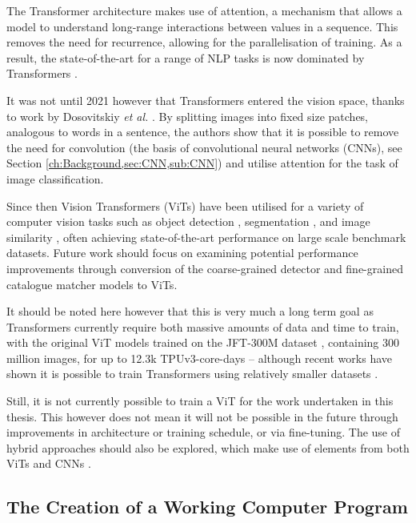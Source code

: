 The Transformer architecture makes use of attention, a mechanism that allows a model to understand long-range interactions between values in a sequence. This removes the need for recurrence, allowing for the parallelisation of training. As a result, the state-of-the-art for a range of NLP tasks is now dominated by Transformers \cite{brown_language_2020, devlin_bert_2019, ng_facebook_2019, wolf_transformers_2020}. 

It was not until 2021 however that Transformers entered the vision space, thanks to work by Dosovitskiy \textit{et al.} \cite{dosovitskiy_image_2021}. By splitting images into fixed size patches, analogous to words in a sentence, the authors show that it is possible to remove the need for convolution (the basis of convolutional neural networks (CNNs), see Section \ref{ch:Background,sec:CNN,sub:CNN}) and utilise attention for the task of image classification. 

Since then Vision Transformers (ViTs) have been utilised for a variety of computer vision tasks such as object detection \cite{fang_you_2021, li_exploring_2022}, segmentation \cite{hu_istr_2021, prangemeier_attention-based_2020, wang_end--end_2021, kirillov_segment_2023}, and image similarity \cite{el-nouby_training_2021}, often achieving state-of-the-art performance on large scale benchmark datasets. Future work should focus on examining potential performance improvements through conversion of the coarse-grained detector and fine-grained catalogue matcher models to ViTs. 

It should be noted here however that this is very much a long term goal as Transformers currently require both massive amounts of data and time to train, with the original ViT models trained on the JFT-300M dataset \cite{sun_revisiting_2017}, containing 300 million images, for up to 12.3k TPUv3-core-days -- although recent works have shown it is possible to train Transformers using relatively smaller datasets \cite{bennour_bat_2022}. 

Still, it is not currently possible to train a ViT for the work undertaken in this thesis. This however does not mean it will not be possible in the future through improvements in architecture or training schedule, or via fine-tuning. The use of hybrid approaches should also be explored, which make use of elements from both ViTs and CNNs \cite{liu_convnet_2022, liu_swin_2021}.

\subsection{The Creation of a Working Computer Program}\label{ch:Conclusion,sec:FutureWork,sub:GUI}

